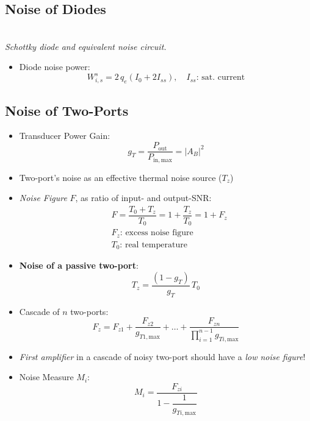 \subsection{Noise of Diodes}
\begin{center}
    \\
    \textit{Schottky diode and equivalent noise circuit.}
\end{center}
\begin{itemize}
    \item Diode noise power:
    \begin{equation*}
        W_{i,s}^s = 2\,q_e (I_0 + 2I_{ss}), \quad I_{ss}\text{: sat. current}
    \end{equation*}
\end{itemize}

\subsection{Noise of Two-Ports}
\begin{itemize}
    \item Transducer Power Gain:
        \begin{equation*}
            g_T = \dfrac{P_{\mathrm{out}}}{P_{\mathrm{in},\mathrm{max}}} = |A_B|^2
        \end{equation*}
    \item Two-port's noise as an effective thermal noise source ($T_z$)
    \item \textit{Noise Figure} $F$, as ratio of input- and output-SNR:
        \begin{align*}
            &F = \dfrac{T_0 + T_z}{T_0} = 1 + \dfrac{T_z}{T_0} = 1 + F_z\\
            &F_z\text{: excess noise figure}\\
            &T_0\text{: real temperature}
        \end{align*}
    \item \textbf{Noise of a passive two-port}:
        \begin{equation*}
            T_z = \dfrac{(1 - g_T)}{g_T}\,T_0
        \end{equation*}
    \item Cascade of $n$ two-ports:
        \begin{equation*}
            F_z = F_{z1} + \dfrac{F_{z2}}{g_{T1,\mathrm{max}}} +\dots+\dfrac{F_{zn}}{\prod\limits_{i=1}^{n-1}g_{Ti,\mathrm{max}}}
        \end{equation*}
    \item \textit{First amplifier} in a cascade of noisy two-port should have a \textit{low noise figure}!
    \item Noise Measure $M_i$:
        \begin{equation*}
            M_i = \dfrac{F_{zi}}{1 - \dfrac{1}{g_{Ti,\mathrm{max}}}}
        \end{equation*}
\end{itemize}
